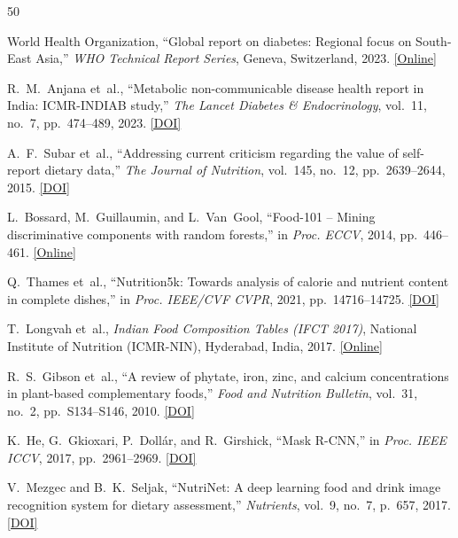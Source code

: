 \documentclass[conference]{IEEEtran}
\begin{document}
\balance

\begin{thebibliography}{50}
\footnotesize
\setlength{\itemsep}{1.4pt plus 0.3pt minus 0.2pt}
\setlength{\parskip}{0pt}
\setlength{\parsep}{0pt}

 World Health Organization, ``Global report on diabetes: Regional focus on South-East Asia,'' \emph{WHO Technical Report Series}, Geneva, Switzerland, 2023. \href{https://www.who.int/publications/i/item/9789241565257}{[Online]}

 R.~M.~Anjana et~al., ``Metabolic non-communicable disease health report in India: ICMR-INDIAB study,'' \emph{The Lancet Diabetes \& Endocrinology}, vol.~11, no.~7, pp.~474--489, 2023. \href{https://doi.org/10.1016/S2213-8587(23)00119-5}{[DOI]}

 A.~F.~Subar et~al., ``Addressing current criticism regarding the value of self-report dietary data,'' \emph{The Journal of Nutrition}, vol.~145, no.~12, pp.~2639--2644, 2015. \href{https://doi.org/10.3945/jn.115.219634}{[DOI]}

 L.~Bossard, M.~Guillaumin, and L.~Van~Gool, ``Food-101 -- Mining discriminative components with random forests,'' in \emph{Proc. ECCV}, 2014, pp.~446--461. \href{https://data.vision.ee.ethz.ch/cvl/datasets_extra/food-101/}{[Online]}

 Q.~Thames et~al., ``Nutrition5k: Towards analysis of calorie and nutrient content in complete dishes,'' in \emph{Proc. IEEE/CVF CVPR}, 2021, pp.~14716--14725. \href{https://doi.org/10.1109/CVPR46437.2021.01448}{[DOI]}

 T.~Longvah et~al., \emph{Indian Food Composition Tables (IFCT 2017)}, National Institute of Nutrition (ICMR-NIN), Hyderabad, India, 2017. \href{https://www.nin.res.in/ebooks/IFCT2017.pdf}{[Online]}

 R.~S.~Gibson et~al., ``A review of phytate, iron, zinc, and calcium concentrations in plant-based complementary foods,'' \emph{Food and Nutrition Bulletin}, vol.~31, no.~2, pp.~S134--S146, 2010. \href{https://doi.org/10.1177/15648265100312S206}{[DOI]}

 K.~He, G.~Gkioxari, P.~Doll{\'a}r, and R.~Girshick, ``Mask R-CNN,'' in \emph{Proc. IEEE ICCV}, 2017, pp.~2961--2969. \href{https://doi.org/10.1109/ICCV.2017.322}{[DOI]}

 V.~Mezgec and B.~K.~Seljak, ``NutriNet: A deep learning food and drink image recognition system for dietary assessment,'' \emph{Nutrients}, vol.~9, no.~7, p.~657, 2017. \href{https://doi.org/10.3390/nu9070657}{[DOI]}


\end{thebibliography}
\end{document}
